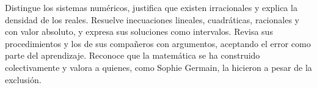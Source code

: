 \documentclass[11pt]{article}
\begin{document}
\matrizevaluacion
  {Distingue los sistemas numéricos, justifica que existen irracionales y
   explica la densidad de los reales.}
  {Resuelve inecuaciones lineales, cuadráticas, racionales y con valor absoluto,
   y expresa sus soluciones como intervalos.}
  {Revisa sus procedimientos y los de sus compañeros con argumentos, aceptando el
   error como parte del aprendizaje.}
  {Reconoce que la matemática se ha construido colectivamente y valora a quienes,
   como Sophie Germain, la hicieron a pesar de la exclusión.}

\autoevaluacion

\seguimientodocente
\end{document}

